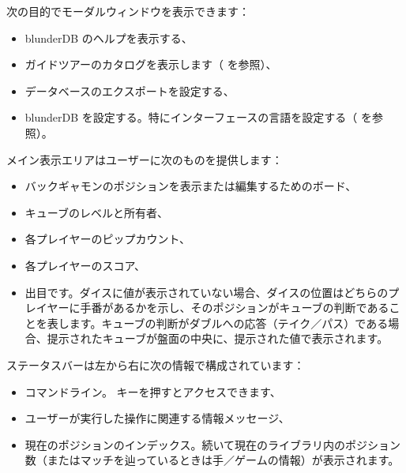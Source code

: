 \documentclass[letterpaper,10pt,dvipdfmx]{sphinxmanual}
\begin{document}
\sphinxAtStartPar
次の目的でモーダルウィンドウを表示できます：
\begin{itemize}
\item {} 
\sphinxAtStartPar
blunderDB のヘルプを表示する、

\item {} 
\sphinxAtStartPar
ガイドツアーのカタログを表示します（ {\hyperref[\detokenize{manuel:visites-guidees}]{}} を参照）、

\item {} 
\sphinxAtStartPar
データベースのエクスポートを設定する、

\item {} 
\sphinxAtStartPar
blunderDB を設定する。特にインターフェースの言語を設定する（{\hyperref[\detokenize{manuel:configuration}]{}} を参照）。

\end{itemize}

\sphinxAtStartPar
メイン表示エリアはユーザーに次のものを提供します：
\begin{itemize}
\item {} 
\sphinxAtStartPar
バックギャモンのポジションを表示または編集するためのボード、

\item {} 
\sphinxAtStartPar
キューブのレベルと所有者、

\item {} 
\sphinxAtStartPar
各プレイヤーのピップカウント、

\item {} 
\sphinxAtStartPar
各プレイヤーのスコア、

\item {} 
\sphinxAtStartPar
出目です。ダイスに値が表示されていない場合、ダイスの位置はどちらのプレイヤーに手番があるかを示し、そのポジションがキューブの判断であることを表します。キューブの判断がダブルへの応答（テイク／パス）である場合、提示されたキューブが盤面の中央に、提示された値で表示されます。

\end{itemize}

\sphinxAtStartPar
ステータスバーは左から右に次の情報で構成されています：
\begin{itemize}
\item {} 
\sphinxAtStartPar
コマンドライン。 キーを押すとアクセスできます、

\item {} 
\sphinxAtStartPar
ユーザーが実行した操作に関連する情報メッセージ、

\item {} 
\sphinxAtStartPar
現在のポジションのインデックス。続いて現在のライブラリ内のポジション数（またはマッチを辿っているときは手／ゲームの情報）が表示されます。

\end{itemize}
\end{document}
